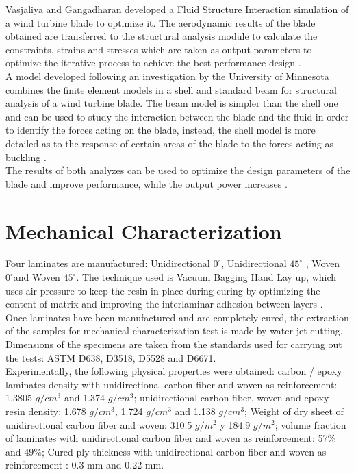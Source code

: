 Vasjaliya and Gangadharan developed a Fluid Structure Interaction simulation of a wind turbine blade to optimize it. The aerodynamic results of the blade obtained are transferred to the structural analysis module to calculate the constraints, strains and stresses which are taken as output parameters to optimize the iterative process to achieve the best performance design \cite{vas}.\\

A model developed following an investigation by the University of Minnesota combines the finite element models in a shell and standard beam for structural analysis of a wind turbine blade. The beam model is simpler than the shell one and can be used to study the interaction between the blade and the fluid in order to identify the forces acting on the blade, instead, the shell model is more detailed as to the response of certain areas of the blade to the forces acting as buckling \cite{dong}.\\

The results of both analyzes can be used to optimize the design parameters of the blade and improve performance, while the output power  increases \cite{dahl}.
\vspace{-0.6cm}
\section{Mechanical Characterization}
\label{sec:3}
Four laminates are manufactured: Unidirectional $0^\circ$, Unidirectional $45^\circ$ , Woven $0^\circ$and Woven $45^\circ$. The technique used is Vacuum Bagging Hand Lay up, which uses air pressure to keep the resin in place during curing by optimizing the content of matrix and improving the interlaminar adhesion between layers \cite{west}.\\ 

Once laminates have been manufactured and are completely cured, the extraction of the samples for mechanical characterization test is made by water jet cutting. Dimensions of the specimens are taken from the standards used for carrying out the tests: ASTM D638, D3518, D5528 and D6671.\\

Experimentally, the following physical properties were obtained: carbon / epoxy laminates density with unidirectional carbon fiber and woven as reinforcement: 1.3805 $g/cm^3$ and 1.374 $g/cm^3$; unidirectional carbon fiber, woven and epoxy resin density: 1.678 $g/cm^3$, 1.724 $g/cm^3$ and 1.138 $g/cm^3$; Weight of dry sheet of unidirectional carbon fiber and woven: 310.5 $g/m^2$ y 184.9 $g/m^2$; volume fraction of laminates with unidirectional carbon fiber and woven as reinforcement: 57{\%} and 49{\%}; Cured ply thickness with unidirectional carbon fiber and woven as reinforcement : 0.3 mm and 0.22 mm.\\

